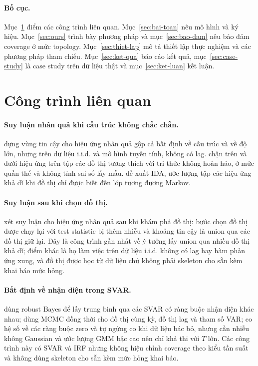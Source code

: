\paragraph{Bố cục.} Mục~\ref{sec:lien-quan} điểm các công trình liên quan. Mục~\ref{sec:bai-toan} nêu mô hình và ký hiệu. Mục~\ref{sec:ours} trình bày phương pháp và mục~\ref{sec:bao-dam} nêu bảo đảm coverage ở mức topology. Mục~\ref{sec:thiet-lap} mô tả thiết lập thực nghiệm và các phương pháp tham chiếu. Mục~\ref{sec:ket-qua} báo cáo kết quả, mục~\ref{sec:case-study} là case study trên dữ liệu thật và mục~\ref{sec:ket-luan} kết luận.

\section{Công trình liên quan}\label{sec:lien-quan}

\paragraph{Suy luận nhân quả khi cấu trúc không chắc chắn.}
\citet{strieder2021confidence,strieder2023confidence,strieder2024dual} dựng vùng tin cậy cho hiệu ứng nhân quả gộp cả bất định về cấu trúc và về độ lớn, nhưng trên dữ liệu i.i.d. và mô hình tuyến tính, không có lag. \citet{padh2025assumed} chặn trên và dưới hiệu ứng trên tập các đồ thị tương thích với tri thức không hoàn hảo, ở mức quần thể và không tính sai số lấy mẫu. \citet{maathuis2009estimating} đề xuất IDA, ước lượng tập các hiệu ứng khả dĩ khi đồ thị chỉ được biết đến lớp tương đương Markov.

\paragraph{Suy luận sau khi chọn đồ thị.}
\citet{chang2026post} xét suy luận cho hiệu ứng nhân quả sau khi khám phá đồ thị: bước chọn đồ thị được chạy lại với test statistic bị thêm nhiễu và khoảng tin cậy là union qua các đồ thị giữ lại. Đây là công trình gần \ours{} nhất về ý tưởng lấy union qua nhiều đồ thị khả dĩ; điểm khác là họ làm việc trên dữ liệu i.i.d. không có lag hay hàm phản ứng xung, và đồ thị được học từ dữ liệu chứ không phải skeleton cho sẵn kèm khai báo mức hỏng.

\paragraph{Bất định về nhận diện trong SVAR.}
\citet{giacomini2022uncertain} dùng robust Bayes để lấy trung bình qua các SVAR có ràng buộc nhận diện khác nhau; \citet{ahelegbey2016bayesian} dùng MCMC đồng thời cho đồ thị cùng kỳ, đồ thị lag và tham số VAR; \citet{keweloh2023uncertain} co hệ số về các ràng buộc zero và tự ngừng co khi dữ liệu bác bỏ, nhưng cần nhiễu không Gaussian và ước lượng GMM bậc cao nên chỉ khả thi với $T$ lớn. Các công trình này có SVAR và IRF nhưng không hiệu chỉnh coverage theo kiểu tần suất và không dùng skeleton cho sẵn kèm mức hỏng khai báo.

